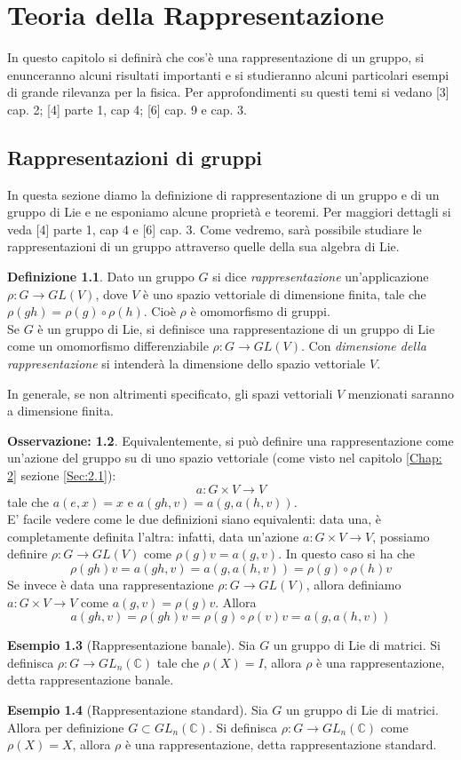 \documentclass[12pt,a4paper]{report}
\theoremstyle{definition}
\newtheorem{Def}{Definizione}[chapter]
\theoremstyle{Theorem}
\theoremstyle{definition}
\newtheorem{Ex}[Def]{Esempio}
\theoremstyle{definition}
\theoremstyle{definition}
\newtheorem{Obs}[Def]{Osservazione:}
\begin{document}
\chapter{Teoria della Rappresentazione}
\label{chap:3}
In questo capitolo si definirà che cos'è una rappresentazione di un gruppo, si enunceranno alcuni risultati importanti e si studieranno alcuni particolari esempi di grande rilevanza per la fisica.
Per approfondimenti su questi temi si vedano [3] cap. 2; [4] parte 1, cap 4; [6] cap. 9 e cap. 3.
\section{Rappresentazioni di gruppi}
In questa sezione diamo la definizione di rappresentazione di un gruppo e di un gruppo di Lie e ne esponiamo alcune proprietà e teoremi. Per maggiori dettagli si veda [4] parte 1, cap 4 e [6] cap. 3.
Come vedremo, sarà possibile studiare le rappresentazioni di un gruppo attraverso quelle della sua algebra di Lie.
\begin{Def}
Dato un gruppo $G$ si dice \textit{rappresentazione} un'applicazione\\ $\rho:G\rightarrow GL(V)$, dove $V$ è uno spazio vettoriale di dimensione finita, tale che $\rho(gh)=\rho(g)\circ\rho(h)$. Cioè $\rho$ è omomorfismo di gruppi.\\
Se $G$ è un gruppo di Lie, si definisce una rappresentazione di un gruppo di Lie come un omomorfismo differenziabile $\rho:G\rightarrow GL(V)$. Con \textit{dimensione della rappresentazione} si intenderà la dimensione dello spazio vettoriale $V$.
\end{Def}
In generale, se non altrimenti specificato, gli spazi vettoriali $V$ menzionati saranno a dimensione finita.
\begin{Obs}
	Equivalentemente, si può definire una rappresentazione come un'azione del gruppo su di uno spazio vettoriale (come visto nel capitolo \ref{Chap: 2} sezione \ref{Sec:2.1}):
	$$a:G\times V\rightarrow V$$
	tale che $a(e,x)=x$ e $a(gh,v)=a(g,a(h,v))$.\\
	E' facile vedere come le due definizioni siano equivalenti: data una, è completamente definita l'altra: infatti, data un'azione $a:G\times V\rightarrow V$, possiamo definire $\rho:G\rightarrow GL(V)$ come $\rho(g)v=a(g,v)$. In questo caso si ha che $$\rho(gh)v=a(gh,v)=a(g,a(h,v))=\rho(g)\circ\rho(h)v$$
		Se invece è data una rappresentazione $\rho:G\rightarrow GL(V)$, allora definiamo $a:G\times V\rightarrow V$ come $a(g,v)=\rho(g)v$. Allora $$a(gh,v)=\rho(gh)v=\rho(g)\circ\rho(v)v=a(g,a(h,v))$$
\end{Obs}
\begin{Ex}[Rappresentazione banale]
	Sia $G$ un gruppo di Lie di matrici. Si definisca $\rho: G\rightarrow GL_n(\mathbb{C})$ tale che $\rho(X)=I$, allora $\rho$ è una rappresentazione, detta rappresentazione banale. 
\end{Ex}
\begin{Ex}[Rappresentazione standard]
	Sia $G$ un gruppo di Lie di matrici. Allora per definizione $G\subset GL_n(\mathbb{C})$. Si definisca $\rho: G\rightarrow GL_n(\mathbb{C})$ come $\rho(X)=X$, allora $\rho$ è una rappresentazione, detta rappresentazione standard. 
\end{Ex}
\end{document}
